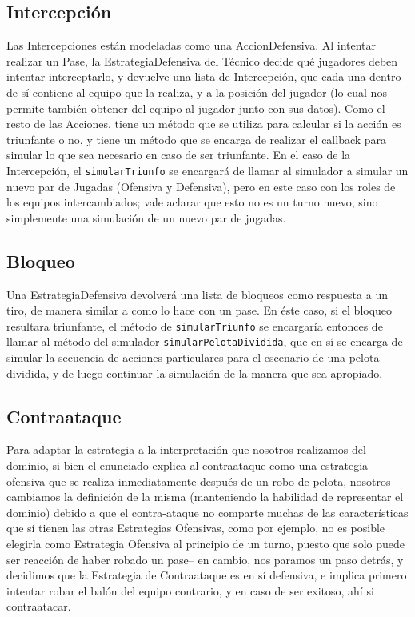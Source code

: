 \subsection{Intercepción}
Las Intercepciones están modeladas como una AccionDefensiva. Al intentar realizar un Pase, la EstrategiaDefensiva del Técnico decide qué jugadores deben intentar interceptarlo, y devuelve una lista de Intercepción, que cada una dentro de sí contiene al equipo que la realiza, y a la posición del jugador (lo cual nos permite también obtener del equipo al jugador junto con sus datos). Como el resto de las Acciones, tiene un método que se utiliza para calcular si la acción es triunfante o no, y tiene un método que se encarga de realizar el callback para simular lo que sea necesario en caso de ser triunfante. En el caso de la Intercepción, el \texttt{simularTriunfo} se encargará de llamar al simulador a simular un nuevo par de Jugadas (Ofensiva y Defensiva), pero en este caso con los roles de los equipos intercambiados; vale aclarar que esto no es un turno nuevo, sino simplemente una simulación de un nuevo par de jugadas.

\subsection{Bloqueo}
Una EstrategiaDefensiva devolverá una lista de bloqueos como respuesta a un tiro, de manera similar a como lo hace con un pase. En éste caso, si el bloqueo resultara triunfante, el método de \texttt{simularTriunfo} se encargaría entonces de llamar al método del simulador \texttt{simularPelotaDividida}, que en sí se encarga de simular la secuencia de acciones particulares para el escenario de una pelota dividida, y de luego continuar la simulación de la manera que sea apropiado.

\subsection{Contraataque}

Para adaptar la estrategia a la interpretación que nosotros realizamos del dominio, si bien el enunciado explica al contraataque como una estrategia ofensiva que se realiza inmediatamente después de un robo de pelota, nosotros cambiamos la definición de la misma (manteniendo la habilidad de representar el dominio) debido a que el contra-ataque no comparte muchas de las características que sí tienen las otras Estrategias Ofensivas, como por ejemplo, no es posible elegirla como Estrategia Ofensiva al principio de un turno, puesto que solo puede ser reacción de haber robado un pase-- en cambio, nos paramos un paso detrás, y decidimos que la Estrategia de Contraataque es en sí defensiva, e implica primero intentar robar el balón del equipo contrario, y en caso de ser exitoso, ahí si contraatacar.

